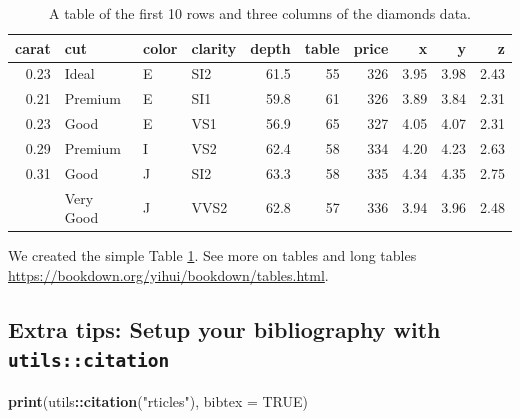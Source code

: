 \documentclass[12pt,]{article}
\newenvironment{Shaded}{\begin{snugshade}}{\end{snugshade}}
\newcommand{\KeywordTok}[1]{\textcolor[rgb]{0.13,0.29,0.53}{\textbf{#1}}}
\newcommand{\DataTypeTok}[1]{\textcolor[rgb]{0.13,0.29,0.53}{#1}}
\newcommand{\StringTok}[1]{\textcolor[rgb]{0.31,0.60,0.02}{#1}}
\newcommand{\OtherTok}[1]{\textcolor[rgb]{0.56,0.35,0.01}{#1}}
\newcommand{\OperatorTok}[1]{\textcolor[rgb]{0.81,0.36,0.00}{\textbf{#1}}}
\newcommand{\NormalTok}[1]{#1}
\begin{document}
\begin{table}[!h]

\caption{\label{tab:tree-diamonds}A table of the first 10 rows and three columns of the diamonds data.}
\centering
\begin{tabular}{rlllrrrrrr}
\toprule
carat & cut & color & clarity & depth & table & price & x & y & z\\
\midrule
0.23 & Ideal & E & SI2 & 61.5 & 55 & 326 & 3.95 & 3.98 & 2.43\\
0.21 & Premium & E & SI1 & 59.8 & 61 & 326 & 3.89 & 3.84 & 2.31\\
0.23 & Good & E & VS1 & 56.9 & 65 & 327 & 4.05 & 4.07 & 2.31\\
0.29 & Premium & I & VS2 & 62.4 & 58 & 334 & 4.20 & 4.23 & 2.63\\
0.31 & Good & J & SI2 & 63.3 & 58 & 335 & 4.34 & 4.35 & 2.75\\
\addlinespace
0.24 & Very Good & J & VVS2 & 62.8 & 57 & 336 & 3.94 & 3.96 & 2.48\\
\bottomrule
\end{tabular}
\end{table}

We created the simple Table \ref{tab:tree-diamonds}. See more on tables
and long tables \url{https://bookdown.org/yihui/bookdown/tables.html}.

\subsection{\texorpdfstring{Extra tips: Setup your bibliography with
\texttt{utils::citation}}{Extra tips: Setup your bibliography with utils::citation}}\label{extra-tips-setup-your-bibliography-with-utilscitation}

\begin{Shaded}
\begin{Highlighting}[]
\KeywordTok{print}\NormalTok{(utils}\OperatorTok{::}\KeywordTok{citation}\NormalTok{(}\StringTok{"rticles"}\NormalTok{), }\DataTypeTok{bibtex =} \OtherTok{TRUE}\NormalTok{)}
\end{Highlighting}
\end{Shaded}
\end{document}
